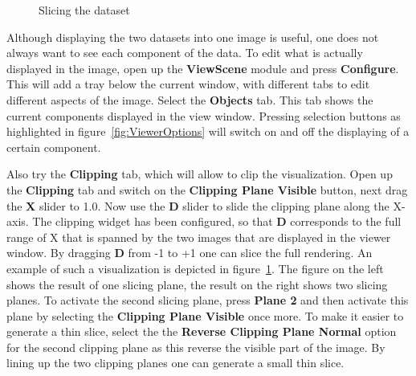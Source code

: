 \documentclass[fleqn,11pt,openany]{book}
\begin{document}
\begin{figure}
\caption{Slicing the dataset}\label{fig:SlicingExample}
\end{figure}

Although displaying the two datasets into one image is useful, one does not always want to see each component of the data. To edit what is actually displayed in the image, open up the {\bf ViewScene} module and press {\bf Configure}. This will add a tray below the current window, with different tabs to edit different aspects of the image.  Select the {\bf Objects} tab. This tab shows the current components displayed in the view window. Pressing  selection buttons as highlighted in figure~\ref{fig:ViewerOptions} will switch on and off the displaying of a certain component.

Also try the {\bf Clipping} tab, which will allow to clip the visualization. Open up the {\bf Clipping} tab and switch on the {\bf Clipping Plane Visible} button, next drag the {\bf X} slider to 1.0. Now use the {\bf D} slider to slide the clipping plane along the X-axis. The clipping widget has been configured, so that {\bf D} corresponds to the full range of X that is spanned by the two images that are displayed in the viewer window. By dragging {\bf D} from -1 to +1 one can slice the full rendering. An example of such a visualization is depicted in figure~\ref{fig:SlicingExample}. The figure on the left shows the result of one slicing plane, the result on the right shows two slicing planes. To activate the second slicing plane, press {\bf Plane 2} and then activate this plane by selecting the {\bf Clipping Plane Visible} once more. To make it easier to generate a thin slice, select the the {\bf Reverse Clipping Plane Normal} option for the second clipping plane as this reverse the visible part of the image. By lining up the two clipping planes one can generate a small thin slice. 
\end{document}
